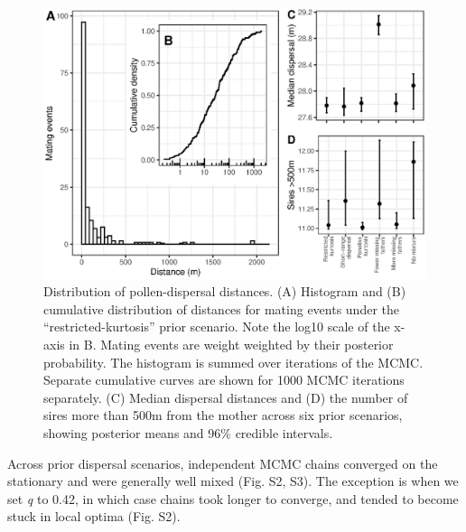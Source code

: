 \documentclass[10pt, a4paper, twocolumn]{article} %
\begin{document}
\begin{figure}
    \centering
    \includegraphics{dispersal.eps}
    \caption{Distribution of pollen-dispersal distances.  (A) Histogram and (B) cumulative distribution of distances for mating events under the “restricted-kurtosis” prior scenario. Note the log10 scale of the x-axis in B. Mating events are weight weighted by their posterior probability. The histogram is summed over iterations of the MCMC. Separate cumulative curves are shown for 1000 MCMC iterations separately. (C) Median dispersal distances and (D) the number of sires more than 500m from the mother across six prior scenarios, showing posterior means and 96\% credible intervals.}
    \label{fig:dispersal}
\end{figure}

Across prior dispersal scenarios, independent MCMC chains converged on the stationary and were generally well mixed (Fig. S2, S3).
The exception is when we set \textit{q} to 0.42, in which case chains took longer to converge, and tended to become stuck in local optima (Fig. S2).
\end{document}
